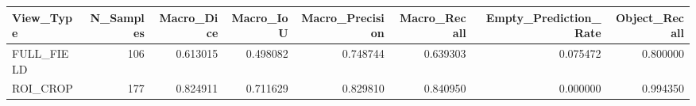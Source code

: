 \begin{tabular}{lrrrrrrr}
\toprule
View_Type & N_Samples & Macro_Dice & Macro_IoU & Macro_Precision & Macro_Recall & Empty_Prediction_Rate & Object_Recall \\
\midrule
FULL_FIELD & 106 & 0.613015 & 0.498082 & 0.748744 & 0.639303 & 0.075472 & 0.800000 \\
ROI_CROP & 177 & 0.824911 & 0.711629 & 0.829810 & 0.840950 & 0.000000 & 0.994350 \\
\bottomrule
\end{tabular}
